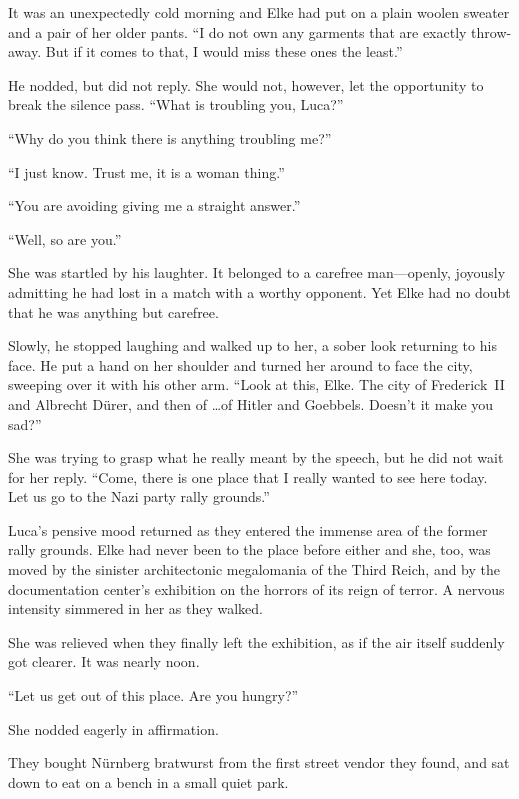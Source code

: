 It was an unexpectedly cold morning and Elke had put on a plain woolen sweater and a pair of her older pants. ``I do not own any garments that are exactly throw-away. But if it comes to that, I would miss these ones the least.''

He nodded, but did not reply. She would not, however, let the opportunity to break the silence pass. ``What is troubling you, Luca?''

``Why do you think there is anything troubling me?''

``I just know. Trust me, it is a woman thing.''

``You are avoiding giving me a straight answer.''

``Well, so are you.''

She was startled by his laughter. It belonged to a carefree man---openly, joyously admitting he had lost in a match with a worthy opponent. Yet Elke had no doubt that he was anything but carefree.

Slowly, he stopped laughing and walked up to her, a sober look returning to his face. He put a hand on her shoulder and turned her around to face the city, sweeping over it with his other arm. ``Look at this, Elke. The city of \mbox{Frederick II} and Albrecht Dürer, and then of \ldots of Hitler and Goebbels. Doesn't it make you sad?''

She was trying to grasp what he really meant by the speech, but he did not wait for her reply. ``Come, there is one place that I really wanted to see here today. Let us go to the Nazi party rally grounds.''

\sectionline

Luca's pensive mood returned as they entered the immense area of the former rally grounds. Elke had never been to the place before either and she, too, was moved by the sinister architectonic megalomania of the Third Reich, and by the documentation center's exhibition on the horrors of its reign of terror. A nervous intensity simmered in her as they walked.

She was relieved when they finally left the exhibition, as if the air itself suddenly got clearer. It was nearly noon.

``Let us get out of this place. Are you hungry?''

She nodded eagerly in affirmation.

\sectionline

They bought Nürnberg bratwurst from the first street vendor they found, and sat down to eat on a bench in a small quiet park.

